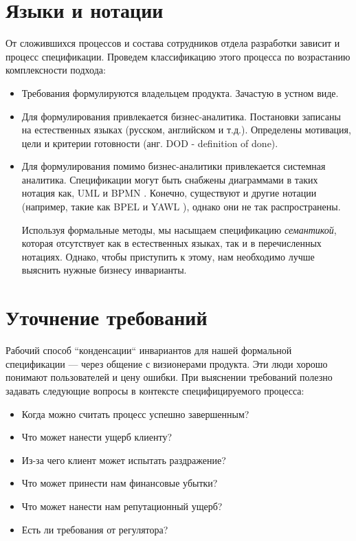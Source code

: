 \documentclass[14pt, openany]{book}
\begin{document}
\section{Языки и нотации}
От сложившихся процессов и состава сотрудников отдела разработки зависит и процесс спецификации. Проведем классификацию этого процесса по возрастанию комплексности подхода:
\begin{itemize}
  \item Требования формулируются владельцем продукта. Зачастую в устном виде.
  \item Для формулирования привлекается бизнес-аналитика. Постановки записаны на естественных языках (русском, английском и т.д.). Определены мотивация, цели и критерии готовности (анг. DOD - definition of done).
  \item Для формулирования помимо бизнес-аналитики привлекается системная аналитика. Спецификации могут быть снабжены диаграммами в таких нотация как, UML \cite{uml} и BPMN \cite{uml}. Конечно, существуют и другие нотации (например, такие как BPEL \cite{bpel} и YAWL \cite{yawl}), однако они не так распространены.

Используя формальные методы, мы насыщаем спецификацию \emph{семантикой}, которая отсутствует как в естественных языках, так и в перечисленных нотациях. Однако, чтобы приступить к этому, нам необходимо лучше выяснить нужные бизнесу инварианты.

\end{itemize}

\section{Уточнение требований}
Рабочий способ ``конденсации`` инвариантов для нашей формальной спецификации --- через общение с визионерами продукта. Эти люди хорошо понимают пользователей и цену ошибки. При выяснении требований полезно задавать следующие вопросы в контексте специфицируемого процесса:
\begin{itemize}
  \item Когда можно считать процесс успешно завершенным?
  \item Что может нанести ущерб клиенту?
  \item Из-за чего клиент может испытать раздражение?
  \item Что может принести нам финансовые убытки?
  \item Что может нанести нам репутационный ущерб?
  \item Есть ли требования от регулятора?
\end{itemize}
\end{document}
